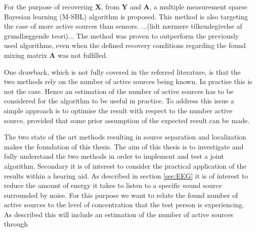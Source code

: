 For the purpose of recovering $\textbf{X}$, from $\textbf{Y}$ and $\textbf{A}$, a multiple measurement sparse Bayesian learning (M-SBL) algorithm is proposed. This method is also targeting the case of more active sources than sensors. ...(lidt nærmere tilkendegivelse af grundlæggende teori)...
The method was proven to outperform the previously used algorithms, even when the defined recovery conditions regarding the found mixing matrix $\textbf{A}$ was not fulfilled\cite{Balkan2014}.

One drawback, which is not fully covered in the referred literature, is that the two methods rely on the number of active sources being known. 
In practise this is not the case. 
Hence an estimation of the number of active sources has to be considered for the algorithm to be useful in practice. To address this issue a simple approach is to optimise the result with respect to the number active source, provided that some prior assumption of the expected result can be made.      

The two state of the art methods resulting in source separation and localization makes the foundation of this thesis. 
The aim of this thesis is to investigate and fully understand the two methods in order to implement and test a joint algorithm. 
Secondary it is of interest to consider the practical application of the results within a hearing aid.  
As described in section \ref{sec:EEG} it is of interest to reduce the amount of energy it takes to listen to a specific sound source surrounded by noise.
For this purpose we want to relate the found number of active sources to the level of concentration that the test person is experiencing. 
As described this will include an estimation of the number of active sources through


 
